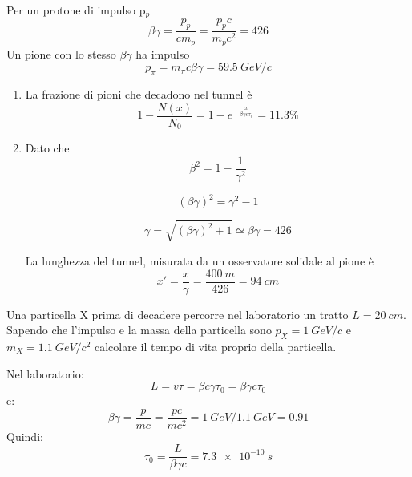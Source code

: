 \begin{Answer}
  
  Per un protone di impulso p$_p$ 
  \[
  \beta \gamma = \frac{p_p}{c m_p} = \frac{p_p c}{m_p c^2} = 426
  \]
  Un pione con lo stesso $\beta \gamma$ ha impulso 
  \[
  p_{\pi} = m_{\pi} c \beta \gamma = \SI{59.5}{GeV/c}
  \]
  
  \begin{enumerate}
  \item  La frazione di pioni che decadono nel tunnel \`e 
    \[
    1 - \frac{N(x)}{N_0} = 1 - e^{-\frac{x}{\beta \gamma c \tau_0}} = 11.3\%
    \]
    
  \item Dato che 
    \[
    \beta^2 = 1 - \frac{1}{\gamma^2}
    \]
    
    \[
    (\beta \gamma)^2 = \gamma^2 -1
    \]
    
    \[
    \gamma = \sqrt{(\beta \gamma)^2 +1} \simeq \beta \gamma = 426
    \]
    
    La lunghezza del tunnel, misurata da un osservatore solidale al pione \`e 
    \[
    x' = \frac{x}{\gamma} = \frac{\SI{400}{m}}{426} = \SI{94}{cm}
    \]

  \end{enumerate}
\end{Answer}


\begin{Exercise}[title={Decadimenti e tempo proprio}]
  Una particella X prima di decadere percorre nel laboratorio un tratto $L=\SI{20}{cm}$.
  Sapendo che l'impulso e la massa della particella sono $p_X=\SI{1}{GeV/c}$ e $m_X=\SI{1.1}{GeV/c^2}$
  calcolare il tempo di vita proprio della particella.
\end{Exercise}
\begin{Answer}
Nel laboratorio:
\[
L=v\tau=\beta c \gamma\tau_0=\beta \gamma c\tau_0
\]
e:
\[
\beta \gamma = \frac{p}{mc} = \frac{pc}{mc^2} = \SI{1}{GeV} / \SI{1.1}{GeV} = 0.91
\]
Quindi:
\[
\tau_0 = \frac{L}{\beta \gamma c}=\SI{7.3e-10}{s}
\]
\end{Answer}
